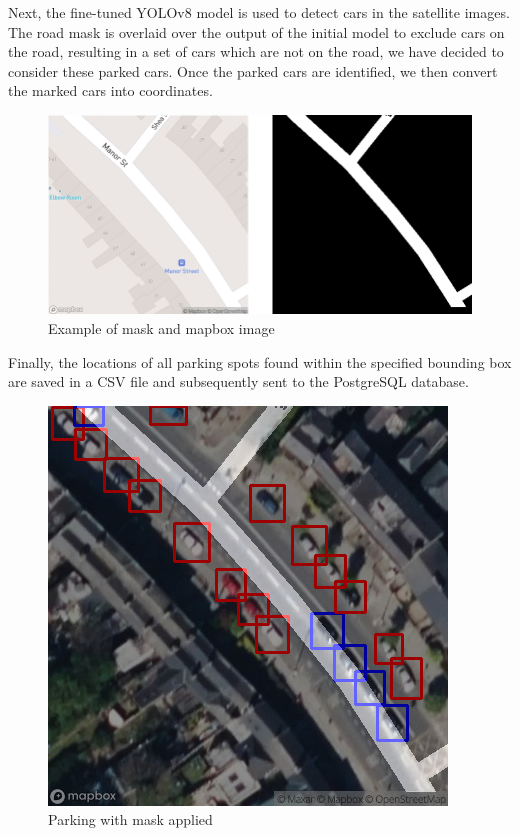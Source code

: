 \noindent{}Next, the fine-tuned YOLOv8 model is used to detect cars in the
satellite images. The road mask is overlaid over the output of the initial model
to exclude cars on the road, resulting in a set of cars which are not on the
road, we have decided to consider these parked cars. Once the parked cars are
identified, we then convert the marked cars into coordinates.

\begin{figure}[h]
    \centering
    \includegraphics[width=\columnwidth]{images/mask_and_mapbox.png}
    \caption{Example of mask and mapbox image}
    \label{fig:mask_and_mapbox}
\end{figure}

\noindent{}Finally, the locations of all parking spots found within the
specified bounding box are saved in a CSV file and subsequently sent to the
PostgreSQL database.

\begin{figure}[h]
    \centering
    \includegraphics[width=0.65\columnwidth]{images/opacity_mask.png}
    \caption{Parking with mask applied}
    \label{fig:parking_detection}
\end{figure}

